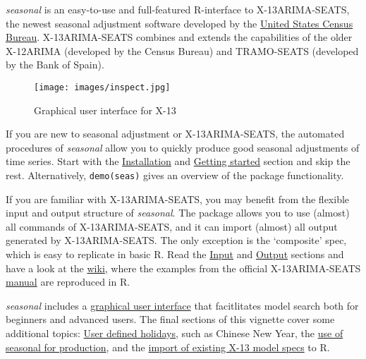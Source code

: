 \emph{seasonal} is an easy-to-use and full-featured R-interface to
X-13ARIMA-SEATS, the newest seasonal adjustment software developed by
the \href{http://www.census.gov/srd/www/x13as/}{United States Census
Bureau}. X-13ARIMA-SEATS combines and extends the capabilities of the
older X-12ARIMA (developed by the Census Bureau) and TRAMO-SEATS
(developed by the Bank of Spain).

\begin{figure}[htbp]
\centering
\texttt{[image: images/inspect.jpg]}
\caption{Graphical user interface for X-13}
\end{figure}

If you are new to seasonal adjustment or X-13ARIMA-SEATS, the automated
procedures of \emph{seasonal} allow you to quickly produce good seasonal
adjustments of time series. Start with the
\hyperref[installation]{Installation} and
\hyperref[getting-started]{Getting started} section and skip the rest.
Alternatively, \texttt{demo(seas)} gives an overview of the package
functionality.

If you are familiar with X-13ARIMA-SEATS, you may benefit from the
flexible input and output structure of \emph{seasonal}. The package
allows you to use (almost) all commands of X-13ARIMA-SEATS, and it can
import (almost) all output generated by X-13ARIMA-SEATS. The only
exception is the `composite' spec, which is easy to replicate in basic
R. Read the \hyperref[input]{Input} and \hyperref[output]{Output}
sections and have a look at the
\href{https://github.com/christophsax/seasonal/wiki/Examples-of-X-13ARIMA-SEATS-in-R}{wiki},
where the examples from the official X-13ARIMA-SEATS
\href{http://www.census.gov/ts/x13as/docX13ASHTML.pdf}{manual} are
reproduced in R.

\emph{seasonal} includes a \hyperref[inspect]{graphical user interface}
that facitlitates model search both for beginners and advanced users.
The final sections of this vignette cover some additional topics:
\hyperref[chinese-new-ux5cux2520year-indian-diwali-in-other-customized-holidays]{User
defined holidays}, such as Chinese New Year, the
\hyperref[production-use]{use of seasonal for production}, and the
\hyperref[import-x-13-models-and-series]{import of existing X-13 model
specs} to R.


